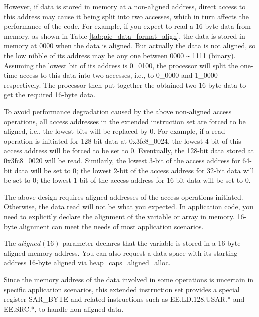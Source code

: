 \documentclass[main\_\_EN.tex]{subfiles}
\begin{document}
However, if data is stored in memory at a non-aligned address, direct access to this address may cause it being split into two accesses, which in turn affects the performance of the code. For example, if you expect to read a 16-byte data from memory, as shown in Table \ref{tab:pie_data_format_align}, the data is stored in memory at 0000 when the data is aligned. But actually the data is not aligned, so the low nibble of its address may be any one between 0000 \verb+~+ 1111 (binary). Assuming the lowest bit of its address is 0\_0100, the processor will split the one-time access to this data into two accesses, i.e., to 0\_0000 and
1\_0000 respectively. The processor then put together the obtained two 16-byte data to get the required 16-byte data.

To avoid performance degradation caused by the above non-aligned access operations, all access addresses in the extended instruction set are forced to be aligned, i.e., the lowest bits will be replaced by 0. For example, if a read operation is initiated for 128-bit data at 0x{}3fc8\_0024, the lowest 4-bit of this access address will be forced to be set to 0. Eventually, the 128-bit data stored at 0x{}3fc8\_0020 will be read. Similarly, the lowest 3-bit of the access address for 64-bit data will be set to 0; the lowest 2-bit of the access address for 32-bit data will be set to 0; the lowest 1-bit of the access address for 16-bit data will be set to 0.

The above design requires aligned addresses of the access operations initiated. Otherwise, the data read will not be what you expected. In application code, you need to explicitly declare the alignment of the variable or array in memory. 16-byte alignment can meet the needs of most application scenarios.

The \begin{math}aligned(16)\end{math} parameter declares that the variable is stored in a 16-byte aligned memory address. You can also request a data space with its starting address 16-byte aligned via heap\_caps\_aligned\_alloc.

Since the memory address of the data involved in some operations is uncertain in specific application scenarios, this extended instruction set provides a special register SAR\_BYTE and related instructions such as EE.LD.128.USAR.* and EE.SRC.*, to handle non-aligned data.
\end{document}
